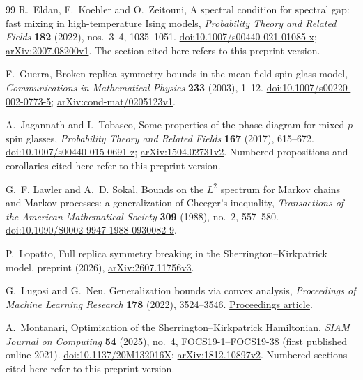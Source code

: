\begin{thebibliography}{99}
R.~Eldan, F.~Koehler and O.~Zeitouni,
\newblock A spectral condition for spectral gap: fast mixing in
high-temperature Ising models,
\newblock \emph{Probability Theory and Related Fields}
\textbf{182} (2022), nos.~3--4, 1035--1051.
\newblock \href{https://doi.org/10.1007/s00440-021-01085-x}{doi:10.1007/s00440-021-01085-x};
\href{https://arxiv.org/abs/2007.08200v1}{arXiv:2007.08200v1}.
The section cited here refers to this preprint version.

F.~Guerra,
\newblock Broken replica symmetry bounds in the mean field spin glass model,
\newblock \emph{Communications in Mathematical Physics}
\textbf{233} (2003), 1--12.
\newblock \href{https://doi.org/10.1007/s00220-002-0773-5}{doi:10.1007/s00220-002-0773-5};
\href{https://arxiv.org/abs/cond-mat/0205123v1}{arXiv:cond-mat/0205123v1}.

A.~Jagannath and I.~Tobasco,
\newblock Some properties of the phase diagram for mixed $p$-spin glasses,
\newblock \emph{Probability Theory and Related Fields}
\textbf{167} (2017), 615--672.
\newblock \href{https://doi.org/10.1007/s00440-015-0691-z}{doi:10.1007/s00440-015-0691-z};
\href{https://arxiv.org/abs/1504.02731v2}{arXiv:1504.02731v2}.
Numbered propositions and corollaries cited here refer to this preprint version.

G.~F. Lawler and A.~D. Sokal,
\newblock Bounds on the $L^2$ spectrum for Markov chains and Markov
processes: a generalization of Cheeger's inequality,
\newblock \emph{Transactions of the American Mathematical Society}
\textbf{309} (1988), no.~2, 557--580.
\newblock \href{https://doi.org/10.1090/S0002-9947-1988-0930082-9}{doi:10.1090/S0002-9947-1988-0930082-9}.

P.~Lopatto,
\newblock Full replica symmetry breaking in the Sherrington--Kirkpatrick model,
\newblock preprint (2026),
\href{https://arxiv.org/abs/2607.11756v3}{arXiv:2607.11756v3}.

G.~Lugosi and G.~Neu,
\newblock Generalization bounds via convex analysis,
\newblock \emph{Proceedings of Machine Learning Research}
\textbf{178} (2022), 3524--3546.
\newblock \href{https://proceedings.mlr.press/v178/lugosi22a.html}{Proceedings article}.

A.~Montanari,
\newblock Optimization of the Sherrington--Kirkpatrick Hamiltonian,
\newblock \emph{SIAM Journal on Computing}
\textbf{54} (2025), no.~4, FOCS19-1--FOCS19-38
(first published online 2021).
\newblock \href{https://doi.org/10.1137/20M132016X}{doi:10.1137/20M132016X};
\href{https://arxiv.org/abs/1812.10897v2}{arXiv:1812.10897v2}.
Numbered sections cited here refer to this preprint version.


\end{thebibliography}
